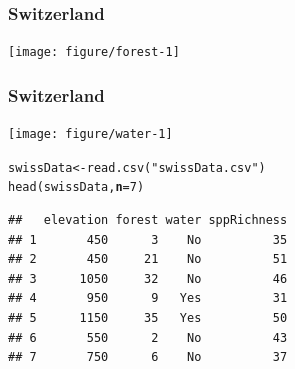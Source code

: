 \documentclass[color=usenames,dvipsnames]{beamer}\usepackage[]{graphicx}\usepackage[]{color}
\makeatletter
\newcommand{\hlnum}[1]{\textcolor[rgb]{0.69,0.494,0}{#1}}%
\newcommand{\hlstr}[1]{\textcolor[rgb]{0.749,0.012,0.012}{#1}}%
\newcommand{\hlstd}[1]{\textcolor[rgb]{0,0,0}{#1}}%
\newcommand{\hlkwb}[1]{\textcolor[rgb]{0,0.341,0.682}{#1}}%
\newcommand{\hlkwc}[1]{\textcolor[rgb]{0,0,0}{\textbf{#1}}}%
\newcommand{\hlkwd}[1]{\textcolor[rgb]{0.004,0.004,0.506}{#1}}%
\newenvironment{kframe}{%
 \def\at@end@of@kframe{}%
 \ifinner\ifhmode%
  \def\at@end@of@kframe{\end{minipage}}%
  \begin{minipage}{\columnwidth}%
 \fi\fi%
 \def\FrameCommand##1{\hskip\@totalleftmargin \hskip-\fboxsep
 \colorbox{shadecolor}{##1}\hskip-\fboxsep
     \hskip-\linewidth \hskip-\@totalleftmargin \hskip\columnwidth}%
 \MakeFramed {\advance\hsize-\width
   \@totalleftmargin\z@ \linewidth\hsize
   \@setminipage}}%
 {\par\unskip\endMakeFramed%
 \at@end@of@kframe}
\newenvironment{knitrout}{}{} %
\makeatother
\begin{document}
\begin{frame}[fragile]
  \frametitle{Switzerland}
  \tiny

\texttt{[image: figure/forest-1]}
\end{frame}





\begin{frame}[fragile]
  \frametitle{Switzerland}
  \tiny

\texttt{[image: figure/water-1]}
\end{frame}



\begin{frame}[fragile]
\begin{knitrout}
\color{fgcolor}\begin{kframe}
\begin{alltt}
\hlstd{swissData} \hlkwb{<-} \hlkwd{read.csv}\hlstd{(}\hlstr{"swissData.csv"}\hlstd{)}
\hlkwd{head}\hlstd{(swissData,} \hlkwc{n}\hlstd{=}\hlnum{7}\hlstd{)}
\end{alltt}
\begin{verbatim}
##   elevation forest water sppRichness
## 1       450      3    No          35
## 2       450     21    No          51
## 3      1050     32    No          46
## 4       950      9   Yes          31
## 5      1150     35   Yes          50
## 6       550      2    No          43
## 7       750      6    No          37
\end{verbatim}
\end{kframe}
\end{knitrout}
\end{frame}
\end{document}
